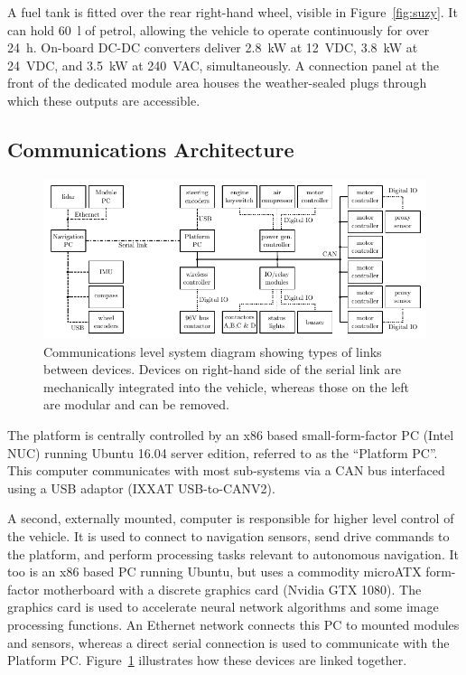 \documentclass[preprint,authoryear,12pt]{elsarticle}
\begin{document}
        A fuel tank is fitted over the rear right-hand wheel, visible in Figure~\ref{fig:suzy}.
        It can hold \SI{60}{\litre} of petrol, allowing the vehicle to operate continuously for over \SI{24}{\hour}.
        On-board DC-DC converters deliver \SI{2.8}{\kilo\watt} at \SI{12}{\volt}DC, \SI{3.8}{\kilo\watt} at \SI{24}{\volt}DC, and \SI{3.5}{\kilo\watt} at \SI{240}{\volt}AC, simultaneously.
        A connection panel at the front of the dedicated module area houses the weather-sealed plugs through which these outputs are accessible.


    \subsection{Communications Architecture}
    \label{sect:architecture}

        \begin{figure}[htb]
            \centering
            \includegraphics[width=\linewidth]{imgs/system_diagram/diagram_v5.pdf}
            \caption{
                Communications level system diagram showing types of links between devices.
                Devices on right-hand side of the serial link are mechanically integrated into the vehicle, whereas those on the left are modular and can be removed.
            }
            \label{fig:system_diagram}
        \end{figure}

        The platform is centrally controlled by an x86 based small-form-factor PC (Intel NUC) running Ubuntu 16.04 server edition, referred to as the ``Platform PC''.
        This computer communicates with most sub-systems via a CAN bus interfaced using a USB adaptor (IXXAT USB-to-CANV2).

        A second, externally mounted, computer is responsible for higher level control of the vehicle.
        It is used to connect to navigation sensors, send drive commands to the platform, and perform processing tasks relevant to autonomous navigation.
        It too is an x86 based PC running Ubuntu, but uses a commodity microATX form-factor motherboard with a discrete graphics card (Nvidia GTX 1080).
        The graphics card is used to accelerate neural network algorithms and some image processing functions.
        An Ethernet network connects this PC to mounted modules and sensors, whereas a direct serial connection is used to communicate with the Platform PC.
        Figure~\ref{fig:system_diagram} illustrates how these devices are linked together.
\end{document}
